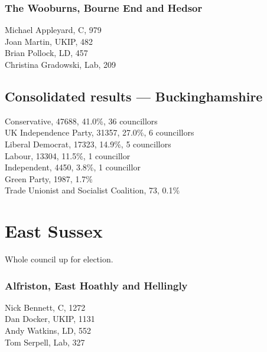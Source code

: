 \documentclass[a4paper,openany,10pt]{book}
\begin{document}
\subsubsection*{The Wooburns, Bourne End and Hedsor}



Michael Appleyard, C, 979\\
Joan Martin, UKIP, 482\\
Brian Pollock, LD, 457\\
Christina Gradowski, Lab, 209\\




\subsection*{Consolidated results --- Buckinghamshire}
Conservative, 47688, 41.0\%, 36 councillors\\
UK Independence Party, 31357, 27.0\%, 6 councillors\\
Liberal Democrat, 17323, 14.9\%, 5 councillors\\
Labour, 13304, 11.5\%, 1 councillor\\
Independent, 4450, 3.8\%, 1 councillor\\
Green Party, 1987, 1.7\% \\
Trade Unionist and Socialist Coalition, 73, 0.1\% \\


\vfill

\section{East Sussex}

Whole council up for election.



\subsubsection*{Alfriston, East Hoathly and Hellingly}



Nick Bennett, C, 1272\\
Dan Docker, UKIP, 1131\\
Andy Watkins, LD, 552\\
Tom Serpell, Lab, 327\\
\end{document}
